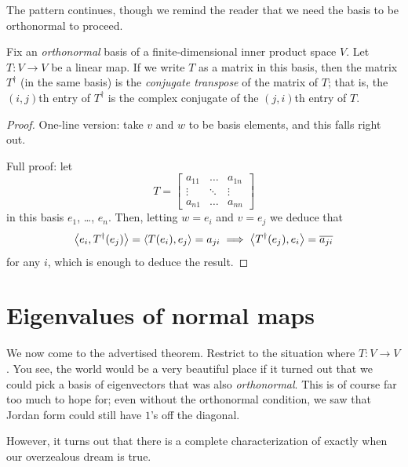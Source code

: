 The pattern continues, though we remind the reader that
we need the basis to be orthonormal to proceed.
\begin{theorem}
	Fix an \emph{orthonormal} basis of a finite-dimensional inner product space $V$.
	Let $T \colon V \to V$ be a linear map.
	If we write $T$ as a matrix in this basis,
	then the matrix $T^\dagger$ (in the same basis)
	is the \emph{conjugate transpose} of the matrix of $T$;
	that is, the $(i,j)$th entry of $T^\dagger$
	is the complex conjugate of the $(j,i)$th entry of $T$.
\end{theorem}
\begin{proof}
	One-line version: take $v$ and $w$ to be basis elements,
	and this falls right out.

	Full proof: let
	\[ T = \begin{bmatrix}
			a_{11} & \dots & a_{1n} \\
			\vdots & \ddots & \vdots \\
			a_{n1} & \dots & a_{nn}
		\end{bmatrix} \]
	in this basis $e_1$, \dots, $e_n$.
	Then, letting $w = e_i$ and $v = e_j$ we deduce that
	\[ \left< e_i, T^\dagger(e_j) \right> = \left< T(e_i) , e_j\right> = a_{ji}
		\implies
		\left< T^\dagger(e_j), e_i \right> = \overline{a_{ji}} \]
	for any $i$, which is enough to deduce the result.
\end{proof}

\section{Eigenvalues of normal maps}
We now come to the advertised theorem.
Restrict to the situation where $T \colon V \to V$.
You see, the world would be a very beautiful place if it turned out
that we could pick a basis of eigenvectors that was also \emph{orthonormal}.
This is of course far too much to hope for;
even without the orthonormal condition,
we saw that Jordan form could still have $1$'s off the diagonal.

However, it turns out that there is
a complete characterization of exactly when our overzealous dream is true.

